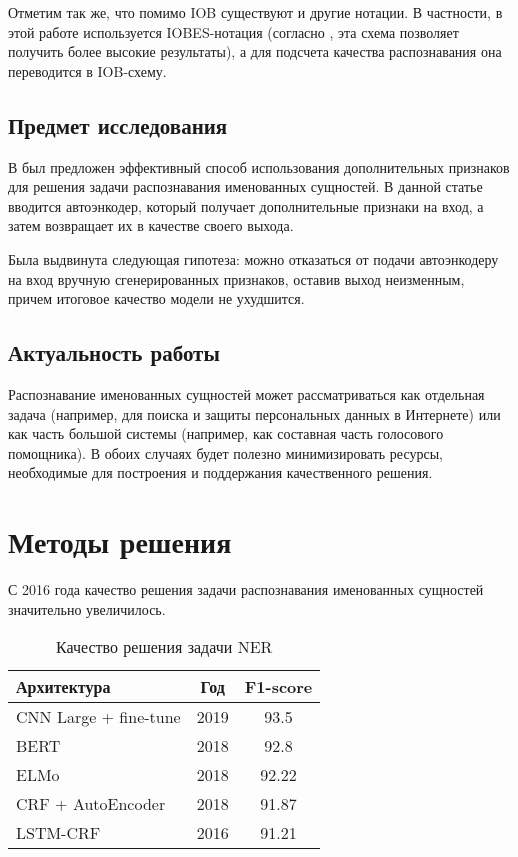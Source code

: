 \documentclass[a4paper,14pt]{extarticle}
\begin{document}
Отметим так же, что помимо IOB существуют и другие нотации. В частности, в этой работе используется IOBES-нотация (согласно \cite{ratinov-roth-2009-design}, \cite{1511.08308} эта схема позволяет получить более высокие результаты), а для подсчета качества распознавания она переводится в IOB-схему.

\subsection{Предмет исследования}

В \cite{1808.09075} был предложен эффективный способ использования дополнительных признаков для решения задачи распознавания именованных сущностей. В данной статье вводится автоэнкодер, который получает дополнительные признаки на вход, а затем возвращает их в качестве своего выхода.

Была выдвинута следующая гипотеза: можно отказаться от подачи автоэнкодеру на вход вручную сгенерированных признаков, оставив выход неизменным, причем итоговое качество модели не ухудшится.

\subsection{Актуальность работы}

Распознавание именованных сущностей может рассматриваться как отдельная задача (например, для поиска и защиты персональных данных в Интернете) или как часть большой системы (например, как составная часть голосового помощника). В обоих случаях будет полезно минимизировать ресурсы, необходимые для построения и поддержания качественного решения.

\clearpage

\section{Методы решения}

С 2016 года качество решения задачи распознавания именованных сущностей значительно увеличилось.

\begin{table}[H]
    \caption{Качество решения задачи NER}
    \label{progress}
    \begin{center}
    \begin{tabular}{l|c|c}
        Архитектура           & Год  & F1-score \\
        \hline
        CNN Large + fine-tune & 2019 & 93.5     \\
        BERT                  & 2018 & 92.8     \\
        ELMo                  & 2018 & 92.22    \\
        CRF + AutoEncoder     & 2018 & 91.87    \\
        LSTM-CRF              & 2016 & 91.21    \\
    \end{tabular}
    \end{center}
\end{table}
\end{document}
